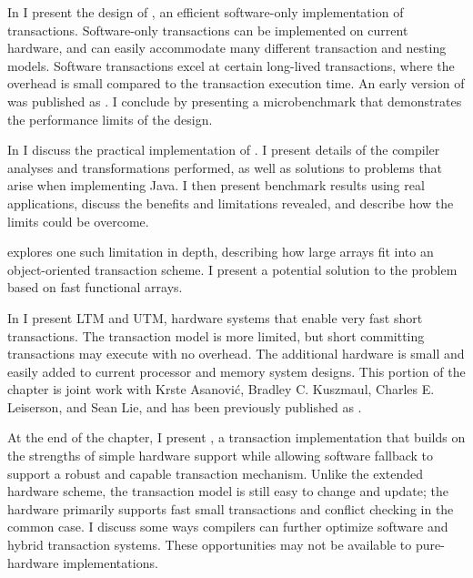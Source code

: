 In  I present the design of \apex, an efficient software-only
implementation of transactions.  Software-only transactions can be
implemented on current hardware, and can easily accommodate many
different transaction and nesting models.  Software transactions excel
at certain long-lived transactions, where the overhead is
small compared to the transaction execution time.  An early version of
\apex was published as \cite{Ananian05}.
I conclude by
presenting a microbenchmark that demonstrates the performance limits of
the design.

In  I discuss the practical implementation of
\apex.  I present details of the compiler
analyses and transformations performed, as well as solutions to
problems that arise when implementing Java.  I then present
benchmark results using real applications, discuss the benefits and
limitations revealed, and describe how the limits could be overcome.

 explores one such limitation in depth,
describing how large arrays fit into an object-oriented transaction
scheme.  I present a potential solution to the problem based on
fast functional arrays.

In  I present LTM and UTM, hardware systems that enable very fast
short transactions.  The transaction model is more limited, but short
committing transactions may execute with no overhead.  The additional
hardware is small and easily added to current processor and memory
system designs.  This portion of the chapter is joint work with Krste
Asanovi\'c, 
Bradley C. Kuszmaul, Charles E. Leiserson, and Sean Lie, and has been
previously published as \cite{AnanianAsKuLeLi05,AnanianAsKuLeLi06}.


At the end of the chapter,
I present \hyx, a  transaction implementation
that builds on the strengths of simple hardware support while
allowing software fallback to support a robust and capable transaction
mechanism.  Unlike the extended hardware scheme, the transaction model
is still easy to change and update; the hardware primarily supports
fast small transactions and conflict checking in the common case.
I discuss some ways compilers can further
optimize software and hybrid transaction systems.  These opportunities
may not be available to pure-hardware implementations.

